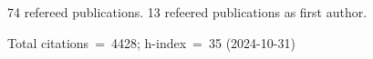 74 refereed publications. 13 refeered publications as first author.

Total citations~=~4428; h-index~=~35 (2024-10-31)